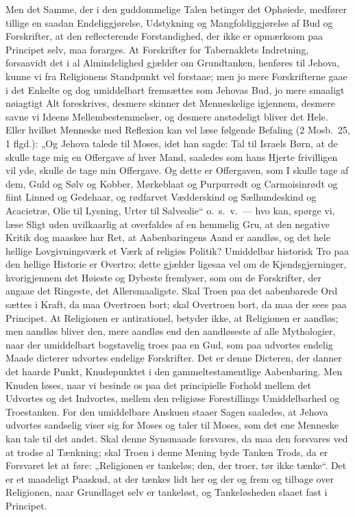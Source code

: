 \documentclass[12pt]{book}
\begin{document}
Men det Samme, der i den guddommelige Talen betinger det Ophøiede,
medfører tillige en saadan Endeliggjørelse, Udstykning og
Mangfoldiggjørelse af Bud og Forskrifter, at den reflecterende
Forstandighed, der ikke er opmærksom paa Principet selv, maa
forarges. At Forskrifter for Tabernaklets Indretning, forsaavidt det
i al Almindelighed gjælder om Grundtanken, henføres til Jehova,
kunne vi fra Religionens Standpunkt vel forstaae; men jo mere
Forskrifterne gaae i det Enkelte og dog umiddelbart fremsættes som
Jehovas Bud, jo mere smaaligt nøiagtigt Alt foreskrives, desmere
skinner det Menneskelige igjennem, desmere savne vi Ideens
Mellembestemmelser, og desmere anstødeligt bliver det Hele. Eller
hvilket Menneske med Reflexion kan vel læse følgende Befaling (2
Mosb.\ 25, 1 flgd.): „Og Jehova talede til Moses, idet han sagde:
Tal til Israels Børn, at de skulle tage mig en Offergave af hver
Mand, saaledes som hans Hjerte frivilligen vil yde, skulle de tage
min Offergave. Og dette er Offergaven, som I skulle tage af dem,
Guld og Sølv og Kobber, Mørkeblaat og Purpurrødt og Carmoisinrødt og
fiint Linned og Gedehaar, og rødfarvet Vædderskind og Sælhundeskind
og Acacietræ, Olie til Lysning, Urter til Salveolie“ o.\ s.\ v.\ ---
hvo kan, spørge vi, læse Sligt uden uvilkaarlig at overfaldes af en
hemmelig Gru, at den negative Kritik dog maaskee har Ret, at
Aabenbaringens Aand er aandløs, og det hele hellige Lovgivningsværk
et Værk af religiøs Politik?
Umiddelbar historisk Tro paa den hellige Historie er Overtro; dette
gjælder ligesaa vel om de Kjendsgjerninger, hvorigjennem det Høieste
og Dybeste fremlyser, som om de Forskrifter, der angaae det
Ringeste, det Allersmaaligste. Skal Troen paa det aabenbarede Ord
sættes i Kraft, da maa Overtroen bort; skal Overtroen bort, da maa
der sees paa Principet. At Religionen er antirationel, betyder ikke,
at Religionen er aandløs; men aandløs bliver den, mere aandløs end
den aandløseste af alle Mythologier, naar der umiddelbart
bogstavelig troes paa en Gud, som paa udvortes endelig Maade
dicterer udvortes endelige Forskrifter. Det er denne Dicteren, der
danner det haarde Punkt, Knudepunktet i den gammeltestamentlige
Aabenbaring. Men Knuden løses, naar vi besinde os paa det
principielle Forhold mellem det Udvortes og det Indvortes, mellem
den religiøse Forestillings Umiddelbarhed og Troestanken. For den
umiddelbare Anskuen staaer Sagen saaledes, at Jehova udvortes
sandselig viser sig for Moses og taler til Moses, som det ene
Menneske kan tale til det andet. Skal denne Synsmaade forsvares, da
maa den forsvares ved at trodse al Tænkning; skal Troen i denne
Mening byde Tanken Trods, da er Forsvaret let at føre: „Religionen
er tankeløs; den, der troer, tør ikke tænke“. Det er et maadeligt
Paaskud, at der tænkes lidt her og der og frem og tilbage over
Religionen, naar Grundlaget selv er tankeløst, og Tankeløsheden
slaaet fast i Principet.
\end{document}
